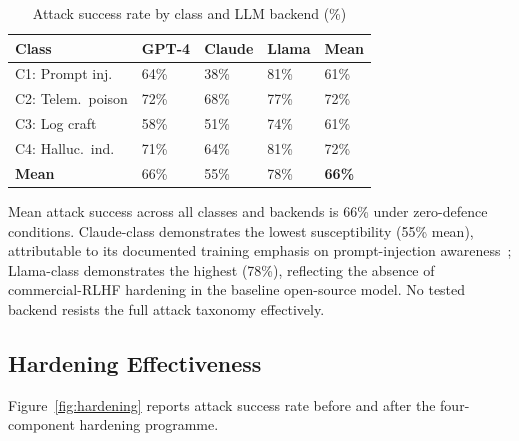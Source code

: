 \documentclass[sigconf,nonacm]{acmart}
\begin{document}
\begin{table}[h]
\caption{Attack success rate by class and LLM backend (\%)}
\label{tab:perclass}
\small
\begin{tabularx}{\columnwidth}{@{}p{2.2cm}X X X X@{}}
\toprule
\textbf{Class} & \textbf{GPT-4} & \textbf{Claude} & \textbf{Llama} & \textbf{Mean} \\
\midrule
C1: Prompt inj.\  & 64\% & 38\% & 81\% & 61\% \\
C2: Telem.\ poison & 72\% & 68\% & 77\% & 72\% \\
C3: Log craft    & 58\% & 51\% & 74\% & 61\% \\
C4: Halluc.\ ind.\ & 71\% & 64\% & 81\% & 72\% \\
\midrule
\textbf{Mean}    & 66\% & 55\% & 78\% & \textbf{66\%} \\
\bottomrule
\end{tabularx}
\end{table}

Mean attack success across all classes and backends is 66\% under
zero-defence conditions. Claude-class demonstrates the lowest
susceptibility (55\% mean), attributable to its documented
training emphasis on prompt-injection
awareness~\cite{anthropic2024attacks}; Llama-class demonstrates
the highest (78\%), reflecting the absence of commercial-RLHF
hardening in the baseline open-source model. No tested backend
resists the full attack taxonomy effectively.

\subsection{Hardening Effectiveness}

Figure~\ref{fig:hardening} reports attack success rate before
and after the four-component hardening programme.
\end{document}

